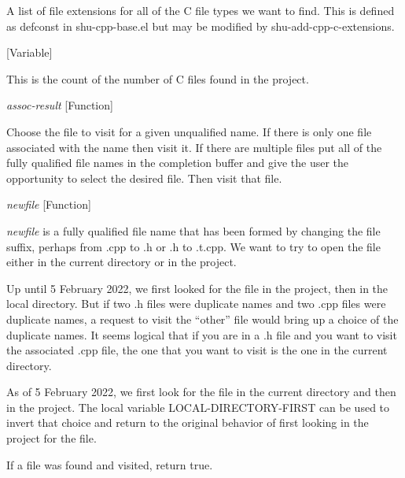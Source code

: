 \begin{doc-string}
A list of file extensions for all of the C file types we want to find.  This is defined
as defconst in shu-cpp-base.el but may be modified by shu-add-cpp-c-extensions.
\end{doc-string}

\vspace{1em}
\noindent
{}
\usebox{\funcname}
 \hfill [Variable]

\begin{doc-string}
This is the count of the number of C files found in the project.
\end{doc-string}

\vspace{1em}
\noindent
{}
\usebox{\funcname}\emph{assoc-result}
 \hfill [Function]

\begin{doc-string}
Choose the file to visit for a given unqualified name.  If there is
only one file associated with the name then visit it.  If there are
multiple files put all of the fully qualified file names in the completion
buffer and give the user the opportunity to select the desired file.  Then
visit that file.
\end{doc-string}

\vspace{1em}
\noindent
{}
\usebox{\funcname}\emph{newfile}
 \hfill [Function]

\begin{doc-string}
\emph{newfile} is a fully qualified file name that has been formed by changing the
file suffix, perhaps from .cpp to .h or .h to .t.cpp.  We want to try to open
the file either in the current directory or in the project.

Up until 5 February 2022, we first looked for the file in the project, then in
the local directory.  But if two .h files were duplicate names and two .cpp
files were duplicate names, a request to visit the ``other'' file would bring up
a choice of the duplicate names.  It seems logical that if you are in a .h file
and you want to visit the associated .cpp file, the one that you want to visit
is the one in the current directory.

As of 5 February 2022, we first look for the file in the current directory and
then in the project.  The local variable LOCAL-DIRECTORY-FIRST can be used to
invert that choice and return to the original behavior of first looking in the
project for the file.

If a file was found and visited, return true.
\end{doc-string}


